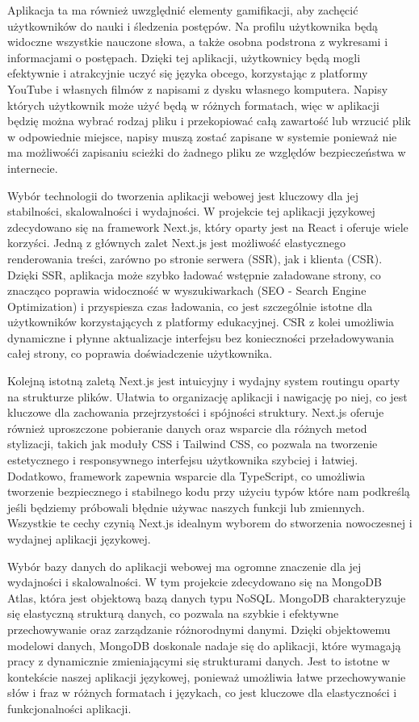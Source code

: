 Aplikacja ta ma również uwzględnić elementy gamifikacji, aby zachęcić użytkowników do nauki i śledzenia postępów. Na profilu użytkownika będą widoczne wszystkie nauczone słowa, a także osobna podstrona z wykresami i informacjami o postępach. Dzięki tej aplikacji, użytkownicy będą mogli efektywnie i atrakcyjnie uczyć się języka obcego, korzystając z platformy YouTube i własnych filmów z napisami z dysku własnego komputera. Napisy których użytkownik może użyć będą w różnych formatach, więc w aplikacji będzię można wybrać rodzaj pliku i przekopiować całą zawartość lub wrzucić plik w odpowiednie miejsce, napisy muszą zostać zapisane w systemie ponieważ nie ma możliwośći zapisaniu scieżki do żadnego pliku ze względów bezpieczeństwa w internecie.

Wybór technologii do tworzenia aplikacji webowej jest kluczowy dla jej stabilności, skalowalności i wydajności. W projekcie tej aplikacji językowej zdecydowano się na framework Next.js, który oparty jest na React i oferuje wiele korzyści. Jedną z głównych zalet Next.js jest możliwość elastycznego renderowania treści, zarówno po stronie serwera (SSR), jak i klienta (CSR). Dzięki SSR, aplikacja może szybko ładować wstępnie załadowane strony, co znacząco poprawia widoczność w wyszukiwarkach (SEO - Search Engine Optimization) i przyspiesza czas ładowania, co jest szczególnie istotne dla użytkowników korzystających z platformy edukacyjnej. CSR z kolei umożliwia dynamiczne i płynne aktualizacje interfejsu bez konieczności przeładowywania całej strony, co poprawia doświadczenie użytkownika.

Kolejną istotną zaletą Next.js jest intuicyjny i wydajny system routingu oparty na strukturze plików. Ułatwia to organizację aplikacji i nawigację po niej, co jest kluczowe dla zachowania przejrzystości i spójności struktury. Next.js oferuje również uproszczone pobieranie danych oraz wsparcie dla różnych metod stylizacji, takich jak moduły CSS i Tailwind CSS, co pozwala na tworzenie estetycznego i responsywnego interfejsu użytkownika szybciej i łatwiej. Dodatkowo, framework zapewnia wsparcie dla TypeScript, co umożliwia tworzenie bezpiecznego i stabilnego kodu przy użyciu typów które nam podkreślą jeśli będziemy próbowali błędnie używac naszych funkcji lub zmiennych. Wszystkie te cechy czynią Next.js idealnym wyborem do stworzenia nowoczesnej i wydajnej aplikacji językowej.

Wybór bazy danych do aplikacji webowej ma ogromne znaczenie dla jej wydajności i skalowalności. W tym projekcie zdecydowano się na MongoDB Atlas, która jest objektową bazą danych typu NoSQL. MongoDB charakteryzuje się elastyczną strukturą danych, co pozwala na szybkie i efektywne przechowywanie oraz zarządzanie różnorodnymi danymi. Dzięki objektowemu modelowi danych, MongoDB doskonale nadaje się do aplikacji, które wymagają pracy z dynamicznie zmieniającymi się strukturami danych. Jest to istotne w kontekście naszej aplikacji językowej, ponieważ umożliwia łatwe przechowywanie słów i fraz w różnych formatach i językach, co jest kluczowe dla elastyczności i funkcjonalności aplikacji.

